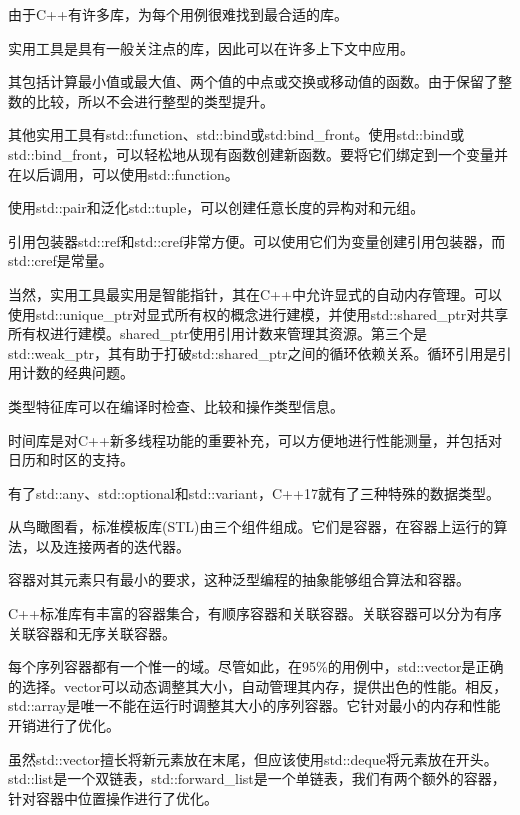 由于C++有许多库，为每个用例很难找到最合适的库。


实用工具是具有一般关注点的库，因此可以在许多上下文中应用。

其包括计算最小值或最大值、两个值的中点或交换或移动值的函数。由于保留了整数的比较，所以不会进行整型的类型提升。

其他实用工具有std::function、std::bind或std:bind\_front。使用std::bind或std::bind\_front，可以轻松地从现有函数创建新函数。要将它们绑定到一个变量并在以后调用，可以使用std::function。

使用std::pair和泛化std::tuple，可以创建任意长度的异构对和元组。

引用包装器std::ref和std::cref非常方便。可以使用它们为变量创建引用包装器，而std::cref是常量。

当然，实用工具最实用是智能指针，其在C++中允许显式的自动内存管理。可以使用std::unique\_ptr对显式所有权的概念进行建模，并使用std::shared\_ptr对共享所有权进行建模。shared\_ptr使用引用计数来管理其资源。第三个是std::weak\_ptr，其有助于打破std::shared\_ptr之间的循环依赖关系。循环引用是引用计数的经典问题。

类型特征库可以在编译时检查、比较和操作类型信息。

时间库是对C++新多线程功能的重要补充，可以方便地进行性能测量，并包括对日历和时区的支持。

有了std::any、std::optional和std::variant，C++17就有了三种特殊的数据类型。



从鸟瞰图看，标准模板库(STL)由三个组件组成。它们是容器，在容器上运行的算法，以及连接两者的迭代器。

容器对其元素只有最小的要求，这种泛型编程的抽象能够组合算法和容器。

C++标准库有丰富的容器集合，有顺序容器和关联容器。关联容器可以分为有序关联容器和无序关联容器。

每个序列容器都有一个惟一的域。尽管如此，在95\%的用例中，std::vector是正确的选择。vector可以动态调整其大小，自动管理其内存，提供出色的性能。相反，std::array是唯一不能在运行时调整其大小的序列容器。它针对最小的内存和性能开销进行了优化。

虽然std::vector擅长将新元素放在末尾，但应该使用std::deque将元素放在开头。std::list是一个双链表，std::forward\_list是一个单链表，我们有两个额外的容器，针对容器中位置操作进行了优化。

